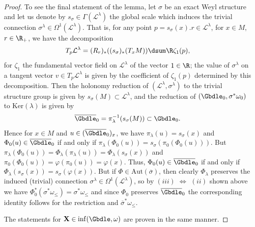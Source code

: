 \begin{proof}
 To see the f\/inal statement of the lemma, let $\sigma$ be an exact Weyl structure and let us denote by $s_{\sigma} \in \Gamma(\mathcal{L}^{\lambda})$ the global scale which induces the trivial connection $\sigma^{\lambda} \in \Omega^1(\mathcal{L}^{\lambda})$. That is, for any point $p = s_{\sigma}(x).r \in \mathcal{L}^{\lambda}$, for $x \in M$, $r \in \R_+$, we have the decomposition
\[
T_p \mathcal{L}^{\lambda} = (R_r)_*((s_{\sigma})_*(T_xM)) \dsum \R \zeta_1(p),
\]
for $\zeta_1$ the fundamental vector f\/ield on $\mathcal{L}^{\lambda}$ of the vector $1 \in \R$; the value of $\sigma^{\lambda}$ on a tangent vector $v \in T_p\mathcal{L}^{\lambda}$ is given by the coef\/f\/icient of $\zeta_1(p)$ determined by this decomposition. Then the holonomy reduction of $(\mathcal{L}^{\lambda},\sigma^{\lambda})$ to the trivial structure group is given by $s_{\sigma}(M) \subset \mathcal{L}^{\lambda}$, and the reduction of $(\Gbdle_0,\sigma^*\omega_0)$ to $\mathrm{Ker}(\lambda)$ is given by
\[
\overline{\Gbdle}_0 = \pi_{\lambda}^{-1}(s_{\sigma}(M)) \subset \Gbdle_0.
\]
Hence for $x \in M$ and $u \in (\overline{\Gbdle}_0)_x$, we have $\pi_{\lambda}(u) = s_{\sigma}(x)$ and $\Phi_0(u) \in \overline{\Gbdle}_0$ if and only if $\pi_{\lambda}(\Phi_0(u)) = s_{\sigma}(\pi_0(\Phi_0(u)))$. But $\pi_{\lambda}(\Phi_0(u)) = \Phi_{\lambda}(\pi_{\lambda}(u)) = \Phi_{\lambda}(s_{\sigma}(x))$ and $\pi_0(\Phi_0(u)) = \varphi(\pi_0(u)) = \varphi(x)$. Thus, $\Phi_0(u) \in \overline{\Gbdle}_0$ if and only if $\Phi_{\lambda}(s_{\sigma}(x)) = s_{\sigma}(\varphi(x))$. But if $\Phi \in \mathrm{Aut}(\overline{\sigma})$, then clearly $\Phi_{\lambda}$ preserves the induced (trivial) connection $\sigma^{\lambda} \in \Omega^1(\mathcal{L}^{\lambda})$, so by $(iii)$ $\Leftrightarrow$ $(ii)$ shown above we have $\Phi_0^*(\sigma^*\omega_{\leq}) = \sigma^*\omega_{\leq}$ and since $\Phi_0$ preserves $\overline{\Gbdle}_0$ the corresponding identity follows for the restriction and $\overline{\sigma}^*\omega_{\leq}$.

 The statements for $\mathbf{X} \in \mathrm{inf}(\Gbdle,\omega)$ are proven in the same manner.
 \end{proof}

